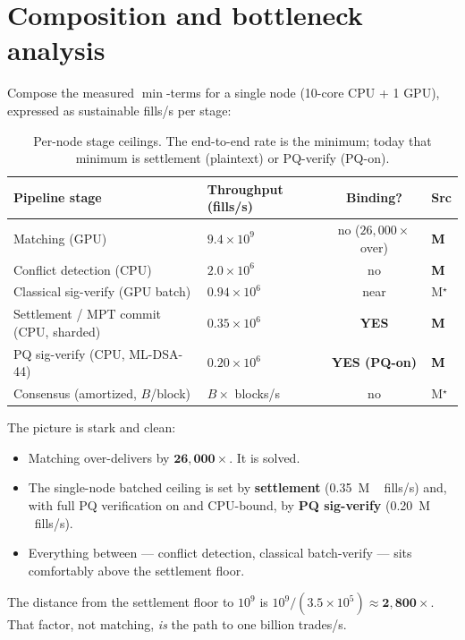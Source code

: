 \documentclass[11pt,a4paper]{article}
\newcommand{\Mnow}{\textbf{\textcolor{black}{M}}}      %
\newcommand{\Mprior}{M$^\star$}                          %
\begin{document}
\section{Composition and bottleneck analysis}\label{sec:composition}

Compose the measured $\min$-terms for a single node (10-core CPU + 1
GPU), expressed as sustainable fills/s per stage:

\begin{table}[h]\centering\small
\begin{tabular}{@{}llcl@{}}
\toprule
Pipeline stage & Throughput (fills/s) & Binding? & Src \\
\midrule
Matching (GPU)                    & $9.4\times10^{9}$ & no ($26{,}000\times$ over) & \Mnow \\
Conflict detection (CPU)          & $2.0\times10^{6}$ & no & \Mnow \\
Classical sig-verify (GPU batch)  & $0.94\times10^{6}$ & near & \Mprior \\
Settlement / MPT commit (CPU, sharded) & $0.35\times10^{6}$ & \textbf{YES} & \Mnow \\
PQ sig-verify (CPU, ML-DSA-44)    & $0.20\times10^{6}$ & \textbf{YES (PQ-on)} & \Mnow \\
Consensus (amortized, $B$/block)  & $B\times$ blocks/s & no & \Mprior \\
\bottomrule
\end{tabular}
\caption{Per-node stage ceilings. The end-to-end rate is the minimum;
today that minimum is settlement (plaintext) or PQ-verify (PQ-on).}
\label{tab:composition}
\end{table}

The picture is stark and clean:
\begin{itemize}[leftmargin=2em,itemsep=1pt]
  \item Matching over-delivers by $\mathbf{26{,}000\times}$. It is solved.
  \item The single-node batched ceiling is set by \textbf{settlement}
        (\SI{0.35}{M\,fills/s}) and, with full PQ verification on and
        CPU-bound, by \textbf{PQ sig-verify} (\SI{0.20}{M\,fills/s}).
  \item Everything between --- conflict detection, classical
        batch-verify --- sits comfortably above the settlement floor.
\end{itemize}

\noindent The distance from the settlement floor to $10^{9}$ is
$10^{9}/(3.5\times10^{5})\approx\mathbf{2{,}800\times}$. That factor, not
matching, \emph{is} the path to one billion trades/s.
\end{document}
